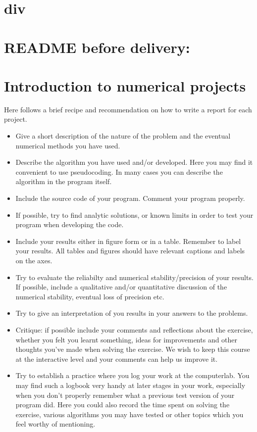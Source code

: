 \documentclass[11pt,a4wide]{article}
\begin{document}
\section{div}








\newpage
\section*{ README before delivery:}

\section*{Introduction to numerical projects}

Here follows a brief recipe and recommendation on how to write a report for each
project.
\begin{itemize}
\item Give a short description of the nature of the problem and the eventual 
numerical methods you have used.
\item Describe the algorithm you have used and/or developed. Here you may find it convenient
to use pseudocoding. In many cases you can describe the algorithm
in the program itself.

\item Include the source code of your program. Comment your program properly.
\item If possible, try to find analytic solutions, or known limits
in order to test your program when developing the code.
\item Include your results either in figure form or in a table. Remember to
       label your results. All tables and figures should have relevant captions
       and labels on the axes.
\item Try to evaluate the reliabilty and numerical stability/precision
of your results. If possible, include a qualitative and/or quantitative
discussion of the numerical stability, eventual loss of precision etc. 

\item Try to give an interpretation of you results in your answers to 
the problems.
\item Critique: if possible include your comments and reflections about the 
exercise, whether you felt you learnt something, ideas for improvements and 
other thoughts you've made when solving the exercise.
We wish to keep this course at the interactive level and your comments can help
us improve it.
\item Try to establish a practice where you log your work at the 
computerlab. You may find such a logbook very handy at later stages
in your work, especially when you don't properly remember 
what a previous test version 
of your program did. Here you could also record 
the time spent on solving the exercise, various algorithms you may have tested
or other topics which you feel worthy of mentioning.
\end{itemize}
\end{document}
